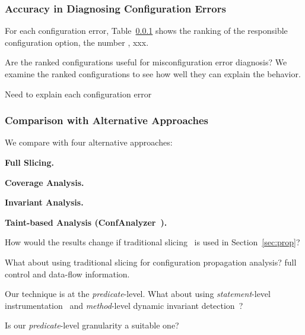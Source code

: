 \subsubsection{Accuracy in Diagnosing Configuration Errors}

For each configuration error, Table~\ref{} shows the ranking of the
responsible configuration option, the number , xxx.


Are the ranked configurations useful for misconfiguration error diagnosis?
We examine the ranked configurations to see how well they can explain the behavior.


Need to explain each configuration error


\subsubsection{Comparison with Alternative Approaches}
\label{sec:comparison}

We compare \ourtool with four alternative approaches:

\noindent \textbf{Full Slicing.}

\noindent \textbf{Coverage Analysis.}

\noindent \textbf{Invariant Analysis.}

\noindent \textbf{Taint-based Analysis (ConfAnalyzer~\cite{Rabkin:2011:PPC}).}

How would the results change if traditional slicing~\cite{Horwitz:1988} is used
in Section~\ref{sec:prop}?

What about using traditional slicing for configuration propagation analysis?
full control and data-flow information.



Our technique is at the \textit{predicate}-level. What about using
\textit{statement}-level instrumentation~\cite{Jones:2002}
 and \textit{method}-level dynamic invariant detection~\cite{Ernst:1999}?

Is our \textit{predicate}-level granularity a suitable one?

